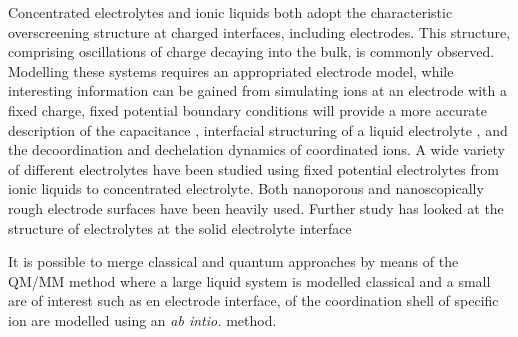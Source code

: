\documentclass[../main.tex]{subfiles}
\begin{document}
Concentrated electrolytes and ionic liquids both adopt the characteristic overscreening structure at charged interfaces, including electrodes. This structure, comprising oscillations of charge decaying into the bulk, is commonly observed\cite{coles_correlation_2020}. Modelling these systems requires an appropriated electrode model, while interesting information can be gained from simulating ions at an electrode with a fixed charge, fixed potential boundary conditions will provide a more accurate description of the capacitance \cite{merlet_simulating_2013, scalfi_semiclassical_2020}, interfacial structuring of a liquid electrolyte \cite{coles_simulation_2019, vatamanu_ramifications_2017, li_capacitive_2018}, and the decoordination and dechelation dynamics of coordinated ions\cite{vatamanu_molecular_2009}. A wide variety of different electrolytes have been studied using fixed potential electrolytes from ionic liquids to concentrated electrolyte. Both nanoporous \cite{merlet_highly_2013, merlet_molecular_2012, vatamanu_molecular_2009, vatamanu_ramifications_2017} and nanoscopically rough electrode surfaces have been heavily used\cite{vatamanu_influence_2011}. Further study has looked at the structure of electrolytes at the solid electrolyte interface\cite{borodin_interfacial_2014}

It is possible to merge classical and quantum approaches by means of the QM/MM method where a large liquid system is modelled classical and a small are of interest such as en electrode interface, of the coordination shell of specific ion are modelled using an \textit{ab intio.} method.

\end{document}
